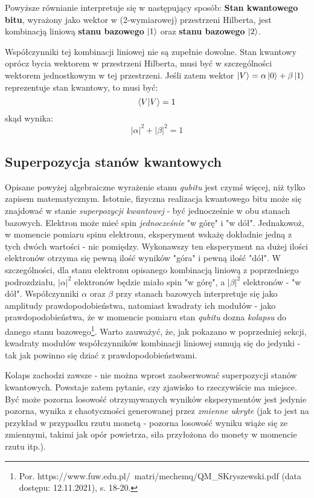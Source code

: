 \documentclass[12pt,a4paper,twoside,openany]{book}
\begin{document}
Powyższe równianie interpretuje się w następujący sposób: \textbf{Stan kwantowego bitu}, wyrażony jako wektor w (2-wymiarowej) przestrzeni Hilberta, jest kombinacją liniową \textbf{stanu bazowego} $\ket{1}$ oraz \textbf{stanu bazowego} $\ket{2}$.

Współczynniki tej kombinacji liniowej nie są zupełnie dowolne. Stan kwantowy oprócz bycia wektorem w przestrzeni Hilberta, musi być w szczególności wektorem jednostkowym w tej przestrzeni. Jeśli zatem wektor $\ket{V} = \alpha\ket{0} + \beta\ket{1}$ reprezentuje stan kwantowy, to musi być:
\begin{equation}
    \braket{V} = 1
\end{equation}
    skąd wynika:\\
\begin{equation}
    |\alpha|^2 + |\beta|^2 = 1
\end{equation}

\subsection{Superpozycja stanów kwantowych}

Opisane powyżej algebraiczne wyrażenie stanu \textit{qubitu} jest czymś więcej, niż tylko zapisem matematycznym. Istotnie, fizyczna realizacja kwantowego bitu może się znajdować w stanie \textit{superpozycji kwantowej} - być jednocześnie w obu stanach bazowych. Elektron może mieć spin \textit{jednocześnie} "w górę" i "w dół". Jednakowoż, w momencie pomiaru spinu elektronu, eksperyment wskażę dokładnie jedną z tych dwóch wartości - nic pomiędzy. Wykonawszy ten eksperyment na dużej ilości elektronów otrzyma się pewną ilość wyników "góra" i pewną ilość "dół". W szczególności, dla stanu elektronu opisanego kombinacją liniową z poprzedniego podrozdziału, $|\alpha|^2$ elektronów będzie miało spin "w górę", a $|\beta|^2$ elektronów - "w dół". Współczynniki $\alpha$ oraz $\beta$ przy stanach bazowych interpretuje się jako amplitudy prawdopodobieństwa, natomiast kwadraty ich modułów - jako prawdopodobieństwa, że w momencie pomiaru stan \textit{qubitu} dozna \textit{kolapsu} do danego stanu bazowego\footnote{Por. https://www.fuw.edu.pl/~matri/mechemq/QM\_SKryszewski.pdf (data dostępu: 12.11.2021), s. 18-20.}. Warto zauważyć, że, jak pokazano w poprzedniej sekcji, kwadraty modułów współczynników kombinacji liniowej sumują się do jedynki - tak jak powinno się dziać z prawdopodobieństwami.

Kolaps zachodzi zawsze - nie można wprost zaobserwować superpozycji stanów kwantowych. Powstaje zatem pytanie, czy zjawisko to rzeczywiście ma miejsce. Być może pozorna losowość otrzymywanych wyników eksperymentów jest jedynie pozorna, wynika z chaotyczności generowanej przez \textit{zmienne ukryte} (jak to jest na przykład w przypadku rzutu monetą - pozorna losowość wyniku wiąże się ze zmiennymi, takimi jak opór powietrza, siła przyłożona do monety w momencie rzutu itp.). 
\end{document}
